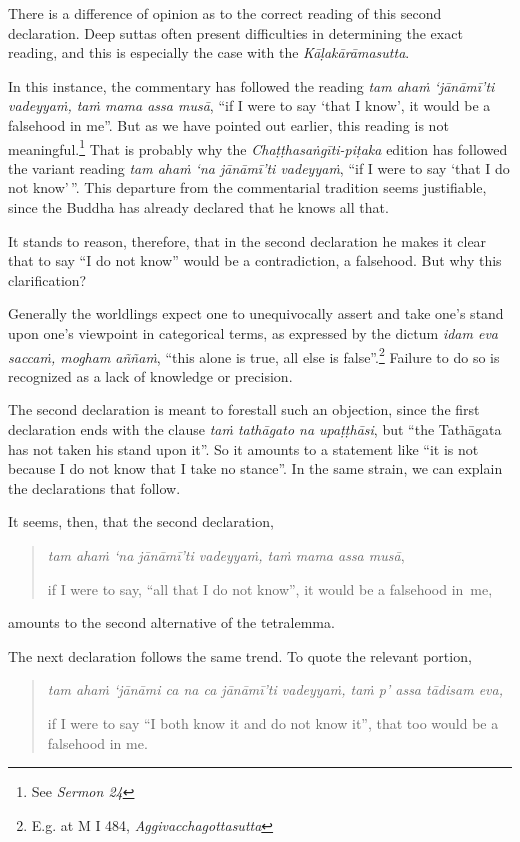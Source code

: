 There is a difference of opinion as to the correct reading of this second declaration. Deep suttas often present difficulties in determining the exact reading, and this is especially the case with the \emph{Kāḷakārāmasutta}.

In this instance, the commentary has followed the reading \emph{tam ahaṁ `jānāmī'ti vadeyyaṁ, taṁ mama assa musā}, ``if I were to say `that I know', it would be a falsehood in me''. But as we have pointed out earlier, this reading is not meaningful.\footnote{See \emph{Sermon 24}} That is probably why the \emph{Chaṭṭhasaṅgīti-piṭaka} edition has followed the variant reading \emph{tam ahaṁ `na jānāmī'ti vadeyyaṁ}, ``if I were to say `that I do not know'\,''. This departure from the commentarial tradition seems justifiable, since the Buddha has already declared that he knows all that.

It stands to reason, therefore, that in the second declaration he makes it clear that to say ``I do not know'' would be a contradiction, a falsehood. But why this clarification?

Generally the worldlings expect one to unequivocally assert and take one's stand upon one's viewpoint in categorical terms, as expressed by the dictum \emph{idam eva saccaṁ, mogham aññaṁ}, ``this alone is true, all else is false''.\footnote{E.g. at M I 484, \emph{Aggivacchagottasutta}} Failure to do so is recognized as a lack of knowledge or precision.

The second declaration is meant to forestall such an objection, since the first declaration ends with the clause \emph{taṁ tathāgato na upaṭṭhāsi}, but ``the Tathāgata has not taken his stand upon it''. So it amounts to a statement like ``it is not because I do not know that I take no stance''. In the same strain, we can explain the declarations that follow.

It seems, then, that the second declaration,

\begin{quote}
\emph{tam ahaṁ `na jānāmī'ti vadeyyaṁ, taṁ mama assa musā},

if I were to say, ``all that I do not know'', it would be a falsehood in~me,
\end{quote}

amounts to the second alternative of the tetralemma.

The next declaration follows the same trend. To quote the relevant portion,

\begin{quote}
\emph{tam ahaṁ `jānāmi ca na ca jānāmī'ti vadeyyaṁ, taṁ p' assa tādisam eva,}

if I were to say ``I both know it and do not know it'', that too would be a falsehood in me.
\end{quote}


